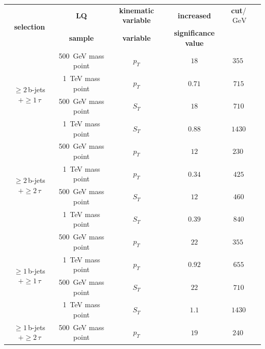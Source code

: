 	\begin{table}[htbp]
		\centering
                \footnotesize
                \renewcommand{\arraystretch}{1.1}
		\begin{tabular*}{\linewidth}{@{\extracolsep{\fill}}cccccc}
		\hline
		\hline
		\multirow{2}{*}{\textbf{selection}}  & \textbf{LQ}  & \textbf{kinematic variable}  & \textbf{increased}      & \textbf{cut}/$\SI{}{\giga\electronvolt}$ 
		\\
                &\textbf{sample}&\textbf{variable}&\textbf{significance value}
                \\
		\hline
		\multirow{4}{*}{$\geq 2\,$b-jets $+\geq 1\,\tau$} &\SI{500}{\giga\electronvolt} mass point  & $p_T$      & $18$      & $\SI{355}{}$
		\\
                &\SI{1}{\tera\electronvolt} mass point  &       $p_T$   & $0.71$        & $715$
                \\
                &\SI{500}{\giga\electronvolt} mass point  &       $S_T$   & $18$        & $710$
                \\
                &\SI{1}{\tera\electronvolt} mass point  &       $S_T$   & $0.88$        & $1430$
                \\
		\hline
		\multirow{4}{*}{$\geq 2\,$b-jets $+\geq 2\,\tau$} &\SI{500}{\giga\electronvolt} mass point  & $p_T$      & $12$      & $\SI{230}{}$
		\\
                &\SI{1}{\tera\electronvolt} mass point  &       $p_T$   & $0.34$        & $425$
                \\
                &\SI{500}{\giga\electronvolt} mass point  &       $S_T$   & $12$        & $460$
                \\
                &\SI{1}{\tera\electronvolt} mass point  &       $S_T$   & $0.39$        & $840$
                \\
		\hline
                \multirow{4}{*}{$\geq 1\,$b-jets $+\geq 1\,\tau$}&\SI{500}{\giga\electronvolt} mass point   & $p_T$      & $22$      & $\SI{355}{}$
		\\
                &\SI{1}{\tera\electronvolt} mass point  &       $p_T$   & $0.92$        & $655$
                \\
                &\SI{500}{\giga\electronvolt} mass point  &       $S_T$   & $22$        & $710$
                \\
                &\SI{1}{\tera\electronvolt} mass point  &       $S_T$   & $1.1$        & $1430$
                \\
		\hline
                \multirow{4}{*}{$\geq 1\,$b-jets $+\geq 2\,\tau$}&\SI{500}{\giga\electronvolt} mass point   & $p_T$      & $19$      & $\SI{240}{}$

\end{tabular*}
\end{table}
